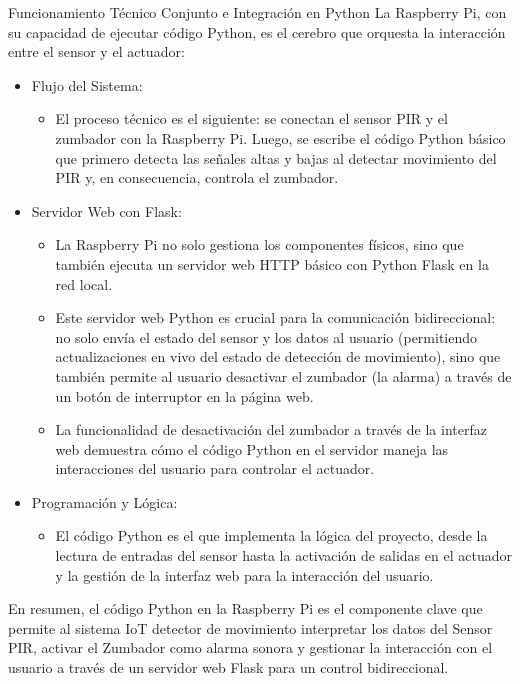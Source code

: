 \documentclass{report}
\begin{document}
Funcionamiento Técnico Conjunto e Integración en Python
La Raspberry Pi, con su capacidad de ejecutar código Python, es el cerebro que orquesta la interacción entre el sensor y el actuador:

\begin{itemize}
    \item Flujo del Sistema:
    \begin{itemize}
        \item El proceso técnico es el siguiente: se conectan el sensor PIR y el zumbador con la Raspberry Pi. 
        Luego, se escribe el código Python básico que primero detecta las señales altas y bajas al detectar movimiento del PIR y, en consecuencia, 
        controla el zumbador.
    \end{itemize}

    \item Servidor Web con Flask:
    \begin{itemize}
        \item La Raspberry Pi no solo gestiona los componentes físicos, sino que también ejecuta un servidor web HTTP 
        básico con Python Flask en la red local.
        \item Este servidor web Python es crucial para la comunicación bidireccional: no solo envía el estado del sensor y los datos al usuario 
        (permitiendo actualizaciones en vivo del estado de detección de movimiento), sino que también permite al usuario 
        desactivar el zumbador (la alarma) a través de un botón de interruptor en la página web.
        \item La funcionalidad de desactivación del zumbador a través de la interfaz web demuestra cómo el código Python en el 
        servidor maneja las interacciones del usuario para controlar el actuador.
    \end{itemize}

    \item Programación y Lógica: 
    \begin{itemize}
        \item El código Python es el que implementa la lógica del proyecto, desde la lectura de entradas del sensor 
        hasta la activación de salidas en el actuador y la gestión de la interfaz web para la interacción del usuario.
    \end{itemize}
\end{itemize}
En resumen, el código Python en la Raspberry Pi es el componente clave que permite al sistema IoT detector de movimiento interpretar los datos 
del Sensor PIR, activar el Zumbador como alarma sonora y gestionar la interacción con el usuario a través de un servidor web Flask para un 
control bidireccional.
\end{document}
